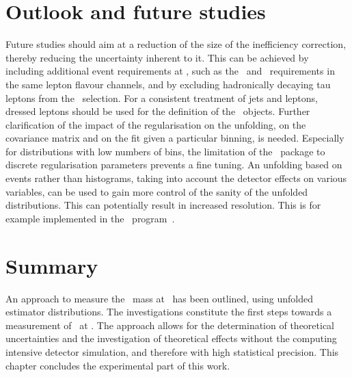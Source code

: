 \section{Outlook and future studies}
%
Future studies should aim at a reduction of the size of the inefficiency correction, thereby reducing the uncertainty inherent to it. This can be achieved by including additional event requirements at \truelevel, such as the \met\ and \mll\ requirements in the same lepton flavour channels, and by excluding hadronically decaying tau leptons from the \truelevel\ selection.
For a consistent treatment of jets and leptons, dressed leptons should be used for the definition of the \truelevel\ objects.
Further clarification of the impact of the regularisation on the unfolding, on the covariance matrix and on the fit given a particular binning, is needed. 
Especially for distributions with low numbers of bins, the limitation of the \Roounfold\ package to discrete regularisation parameters prevents a fine tuning.
An unfolding based on events rather than histograms, taking into account the detector effects on various variables, can be used to gain more control of the sanity of the unfolded distributions. This can potentially result in increased resolution. This is for example implemented in the \TRUEE\ program~\cite{TRUEE,Milke2013133}.







\section{Summary}
%
An approach to measure the \tquark\ mass at \stablevel\ has been outlined, using unfolded estimator distributions. The investigations constitute the first steps towards a measurement of \mt\ at \stablevel.
%
The approach allows for the determination of theoretical uncertainties and the investigation of theoretical effects without the computing intensive detector simulation, and therefore with high statistical precision. 
%
This chapter concludes the experimental part of this work.
%

